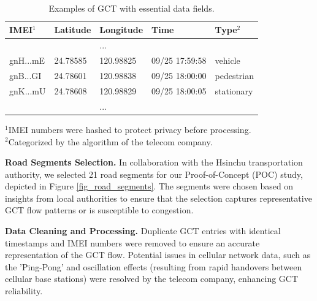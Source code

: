 \documentclass[letterpaper]{article} %
\begin{document}
\begin{table}[h]
  \small
  
  \begin{tabular}{p{1.0cm}p{1.0cm}p{1.2cm}p{1.95cm}p{1.1cm}}
    \hline
    \textbf{IMEI$^{1}$} &  \textbf{Latitude} &  \textbf{Longitude} &  \textbf{Time} &  \textbf{Type$^{2}$}  \\
    \hline
     &   & ... &   &   \\ 
    gnH...mE & 24.78585 & 120.98825 & 09/25 17:59:58 &  vehicle \\ 
    gnB...GI & 24.78601 & 120.98838 & 09/25 18:00:00 & pedestrian \\
    gnK...mU & 24.78608 & 120.98829 & 09/25 18:00:05 & stationary \\
     &   & ... &   &   \\ 
    \hline
  \end{tabular}
  \scriptsize
  $^{1}$IMEI numbers were hashed to protect privacy before processing. \\
  $^{2}$Categorized by the algorithm of the telecom company. 
  \caption{Examples of GCT with essential data fields.}
  \label{tab:raw_table}
\end{table}

\noindent \textbf{Road Segments Selection.}
In collaboration with the Hsinchu transportation authority, we selected 21 road segments for our Proof-of-Concept (POC) study, depicted in Figure \ref{fig_road_segments}. The segments were chosen based on insights from local authorities to ensure that the selection captures representative GCT flow patterns or is susceptible to congestion.

\noindent \textbf{Data Cleaning and Processing.}
Duplicate GCT entries with identical timestamps and IMEI numbers were removed to ensure an accurate representation of the GCT flow. Potential issues in cellular network data, such as the 'Ping-Pong' and oscillation effects \cite{zidic2023analyses} (resulting from rapid handovers between cellular base stations) were resolved by the telecom company, enhancing GCT reliability.
\end{document}
